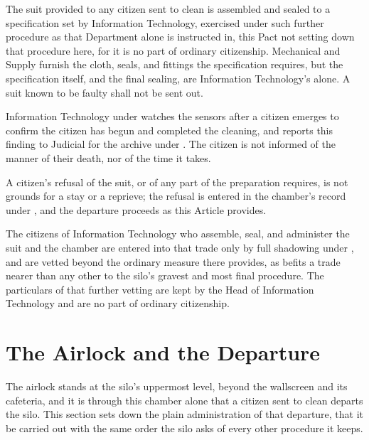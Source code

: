 \begin{clauses}
\item The suit provided to any citizen sent to clean is assembled and sealed to a specification set by Information Technology, exercised under such further procedure as that Department alone is instructed in, this Pact not setting down that procedure here, for it is no part of ordinary citizenship. Mechanical and Supply furnish the cloth, seals, and fittings the specification requires, but the specification itself, and the final sealing, are Information Technology's alone. A suit known to be faulty shall not be sent out.
\item Information Technology under  watches the sensors after a citizen emerges to confirm the citizen has begun and completed the cleaning, and reports this finding to Judicial for the archive under . The citizen is not informed of the manner of their death, nor of the time it takes.
\item A citizen's refusal of the suit, or of any part of the preparation  requires, is not grounds for a stay or a reprieve; the refusal is entered in the chamber's record under , and the departure proceeds as this Article provides.
\item The citizens of Information Technology who assemble, seal, and administer the suit and the chamber are entered into that trade only by full shadowing under , and are vetted beyond the ordinary measure  there provides, as befits a trade nearer than any other to the silo's gravest and most final procedure. The particulars of that further vetting are kept by the Head of Information Technology and are no part of ordinary citizenship.
\end{clauses}

\section{The Airlock and the Departure}
\label{sec:cleaning:airlock-and-the-departure}

The airlock stands at the silo's uppermost level, beyond the wallscreen and its cafeteria, and it is through this chamber alone that a citizen sent to clean departs the silo. This section sets down the plain administration of that departure, that it be carried out with the same order the silo asks of every other procedure it keeps.

